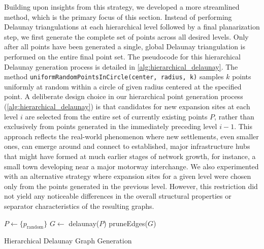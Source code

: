 Building upon insights from this strategy, we developed a more streamlined method, which is the primary focus of this section.
Instead of performing Delaunay triangulations at each hierarchical level followed by a final planarization step, we first generate the complete set of points across all desired levels.
Only after all points have been generated a single, global Delaunay triangulation is performed on the entire final point set.
The pseudocode for this hierarchical Delaunay generation process is detailed in \cref{alg:hierarchical_delaunay}.
The method \texttt{uniformRandomPointsInCircle(center, radius, k)} samples \(k\) points uniformly at random within a circle of given radius centered at the specified point.
A deliberate design choice in our hierarchical point generation process (\cref{alg:hierarchical_delaunay}) is that candidates for new expansion sites at each level \(i\) are selected from the entire set of currently existing points \(P\), rather than exclusively from points generated in the immediately preceding level \(i-1\).
This approach reflects the real-world phenomenon where new settlements, even smaller ones, can emerge around and connect to established, major infrastructure hubs that might have formed at much earlier stages of network growth,
for instance, a small town developing near a major motorway interchange.
We also experimented with an alternative strategy where expansion sites for a given level were chosen only from the points generated in the previous level.
However, this restriction did not yield any noticeable differences in the overall structural properties or separator characteristics of the resulting graphs.
\begin{algorithm}[tbhp]
	\BlankLine
	\(P \longleftarrow \{p_\text{random}\}\)\;
	\BlankLine
	\BlankLine
	\(G \longleftarrow\) delaunay(\(P\))\;
	pruneEdges(\(G\))\;
	\;
	\caption{Hierarchical Delaunay Graph Generation}
	\label{alg:hierarchical_delaunay}
\end{algorithm}

